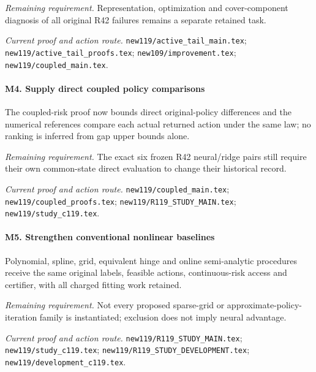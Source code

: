 \par\emph{Remaining requirement.} Representation, optimization and cover-component diagnosis of all original R42 failures remains a separate retained task.

\par\emph{Current proof and action route.} \nolinkurl{new119/active_tail_main.tex}; \nolinkurl{new119/active_tail_proofs.tex}; \nolinkurl{new109/improvement.tex}; \nolinkurl{new119/coupled_main.tex}.

\paragraph{M4. Supply direct coupled policy comparisons}

The coupled-risk proof now bounds direct original-policy differences and the numerical references compare each actual returned action under the same law; no ranking is inferred from gap upper bounds alone.

\par\emph{Remaining requirement.} The exact six frozen R42 neural/\allowbreak{}ridge pairs still require their own common-state direct evaluation to change their historical record.

\par\emph{Current proof and action route.} \nolinkurl{new119/coupled_main.tex}; \nolinkurl{new119/coupled_proofs.tex}; \nolinkurl{new119/R119_STUDY_MAIN.tex}; \nolinkurl{new119/study_c119.tex}.

\paragraph{M5. Strengthen conventional nonlinear baselines}

Polynomial, spline, grid, equivalent hinge and online semi-analytic procedures receive the same original labels, feasible actions, continuous-risk access and certifier, with all charged fitting work retained.

\par\emph{Remaining requirement.} Not every proposed sparse-grid or approximate-policy-iteration family is instantiated; exclusion does not imply neural advantage.

\par\emph{Current proof and action route.} \nolinkurl{new119/R119_STUDY_MAIN.tex}; \nolinkurl{new119/study_c119.tex}; \nolinkurl{new119/R119_STUDY_DEVELOPMENT.tex}; \nolinkurl{new119/development_c119.tex}.

